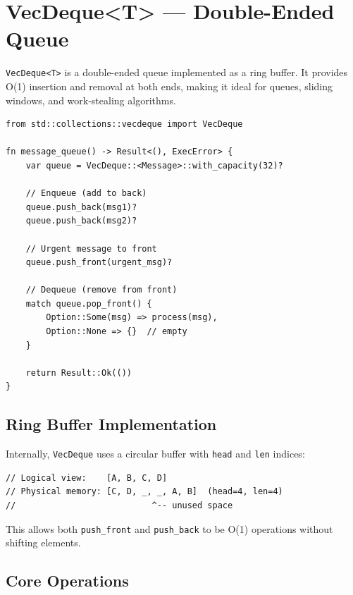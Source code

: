 \section{VecDeque<T> --- Double-Ended Queue}
\label{sec:vecdeque}

\texttt{VecDeque<T>} is a double-ended queue implemented as a ring buffer. It provides O(1) insertion and removal at both ends, making it ideal for queues, sliding windows, and work-stealing algorithms.

\begin{lstlisting}
from std::collections::vecdeque import VecDeque

fn message_queue() -> Result<(), ExecError> {
    var queue = VecDeque::<Message>::with_capacity(32)?

    // Enqueue (add to back)
    queue.push_back(msg1)?
    queue.push_back(msg2)?

    // Urgent message to front
    queue.push_front(urgent_msg)?

    // Dequeue (remove from front)
    match queue.pop_front() {
        Option::Some(msg) => process(msg),
        Option::None => {}  // empty
    }

    return Result::Ok(())
}
\end{lstlisting}

\subsection{Ring Buffer Implementation}

Internally, \texttt{VecDeque} uses a circular buffer with \texttt{head} and \texttt{len} indices:

\begin{lstlisting}
// Logical view:    [A, B, C, D]
// Physical memory: [C, D, _, _, A, B]  (head=4, len=4)
//                           ^-- unused space
\end{lstlisting}

This allows both \texttt{push\_front} and \texttt{push\_back} to be O(1) operations without shifting elements.

\subsection{Core Operations}

